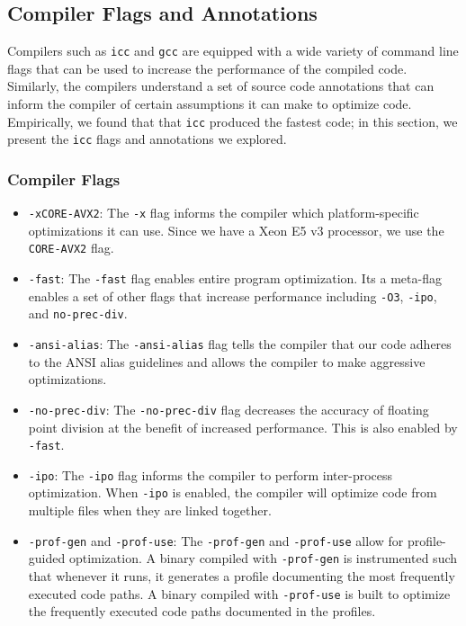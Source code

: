 \newcommand{\ttt}[1]{\texttt{#1}}
\newcommand{\icc}{\texttt{icc}}
\newcommand{\gcc}{\texttt{gcc}}

\subsection{Compiler Flags and Annotations}
Compilers such as \icc{} and \gcc{} are equipped with a wide variety of command
line flags that can be used to increase the performance of the compiled code.
Similarly, the compilers understand a set of source code annotations that can
inform the compiler of certain assumptions it can make to optimize code.
Empirically, we found that that \icc{} produced the fastest code; in this
section, we present the \icc{} flags and annotations we explored.

\subsubsection{Compiler Flags}
\begin{itemize}
  \item \ttt{-xCORE-AVX2}:
    The \ttt{-x} flag informs the compiler which platform-specific
    optimizations it can use. Since we have a Xeon E5 v3 processor, we use the
    \ttt{CORE-AVX2} flag.

  \item \ttt{-fast}:
    The \ttt{-fast} flag enables entire program optimization. Its a meta-flag
    enables a set of other flags that increase performance including \ttt{-O3},
    \ttt{-ipo}, and \ttt{no-prec-div}.

  \item \ttt{-ansi-alias}:
    The \ttt{-ansi-alias} flag tells the compiler that our code adheres to the
    ANSI alias guidelines and allows the compiler to make aggressive
    optimizations.

  \item \ttt{-no-prec-div}:
    The \ttt{-no-prec-div} flag decreases the accuracy of floating point
    division at the benefit of increased performance. This is also enabled by
    \ttt{-fast}.

  \item \ttt{-ipo}:
    The \ttt{-ipo} flag informs the compiler to perform inter-process
    optimization. When \ttt{-ipo} is enabled, the compiler will optimize code
    from multiple files when they are linked together.

  \item \ttt{-prof-gen} and \ttt{-prof-use}:
    The \ttt{-prof-gen} and \ttt{-prof-use} allow for profile-guided
    optimization. A binary compiled with \ttt{-prof-gen} is instrumented such
    that whenever it runs, it generates a profile documenting the most
    frequently executed code paths. A binary compiled with \ttt{-prof-use} is
    built to optimize the frequently executed code paths documented in the
    profiles.
\end{itemize}

